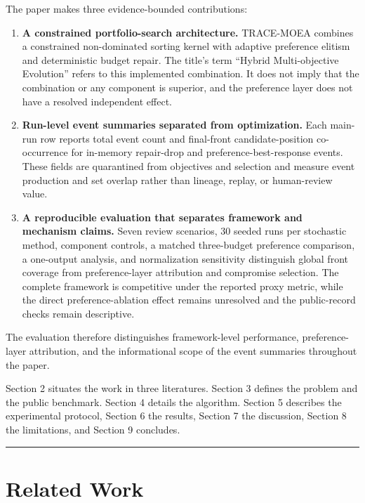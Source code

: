 \documentclass[energies,article,submit,moreauthors]{Definitions/mdpi}
\begin{document}
The paper makes three evidence-bounded contributions:

\begin{enumerate}
\def\labelenumi{\arabic{enumi}.}
\item
  \textbf{A constrained portfolio-search architecture.} TRACE-MOEA combines a constrained non-dominated sorting kernel with adaptive preference elitism and deterministic budget repair. The title's term ``Hybrid Multi-objective Evolution'' refers to this implemented combination. It does not imply that the combination or any component is superior, and the preference layer does not have a resolved independent effect.
\item
  \textbf{Run-level event summaries separated from optimization.} Each main-run row reports total event count and final-front candidate-position co-occurrence for in-memory repair-drop and preference-best-response events. These fields are quarantined from objectives and selection and measure event production and set overlap rather than lineage, replay, or human-review value.
\item
  \textbf{A reproducible evaluation that separates framework and mechanism claims.} Seven review scenarios, 30 seeded runs per stochastic method, component controls, a matched three-budget preference comparison, a one-output analysis, and normalization sensitivity distinguish global front coverage from preference-layer attribution and compromise selection. The complete framework is competitive under the reported proxy metric, while the direct preference-ablation effect remains unresolved and the public-record checks remain descriptive.
\end{enumerate}

The evaluation therefore distinguishes framework-level performance, preference-layer attribution, and the informational scope of the event summaries throughout the paper.

Section 2 situates the work in three literatures. Section 3 defines the problem and the public benchmark. Section 4 details the algorithm. Section 5 describes the experimental protocol, Section 6 the results, Section 7 the discussion, Section 8 the limitations, and Section 9 concludes.

\begin{center}\rule{0.5\linewidth}{0.5pt}\end{center}

\section{Related Work}\label{related-work}
\end{document}
